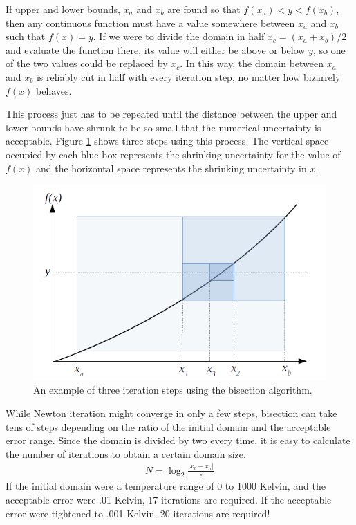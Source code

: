 \documentclass{article}
\begin{document}
If upper and lower bounds, $x_a$ and $x_b$ are found so that $f(x_a) < y < f(x_b)$, then any continuous function must have a value somewhere between $x_a$ and $x_b$ such that $f(x) = y$.  If we were to divide the domain in half $x_c = (x_a+x_b)/2$ and evaluate the function there, its value will either be above or below $y$, so one of the two values could be replaced by $x_c$.  In this way, the domain between $x_a$ and $x_b$ is reliably cut in half with every iteration step, no matter how bizarrely $f(x)$ behaves.

This process just has to be repeated until the distance between the upper and lower bounds have shrunk to be so small that the numerical uncertainty is acceptable.  Figure \ref{fig:1d:bisection} shows three steps using this process.  The vertical space occupied by each blue box represents the shrinking uncertainty for the value of $f(x)$ and the horizontal space represents the shrinking uncertainty in $x$.

\begin{figure}
\centering
\includegraphics[width = 0.8\linewidth]{figures/1d_bisection}
\caption{An example of three iteration steps using the bisection algorithm.}\label{fig:1d:bisection}
\end{figure}

While Newton iteration might converge in only a few steps, bisection can take tens of steps depending on the ratio of the initial domain and the acceptable error range.  Since the domain is divided by two every time, it is easy to calculate the number of iterations to obtain a certain domain size.
\begin{align}
N = \log_2 \frac{|x_b - x_a|}{\epsilon}
\end{align}
If the initial domain were a temperature range of 0 to 1000 Kelvin, and the acceptable error were .01 Kelvin, 17 iterations are required.  If the acceptable error were tightened to .001 Kelvin, 20 iterations are required!
\end{document}
